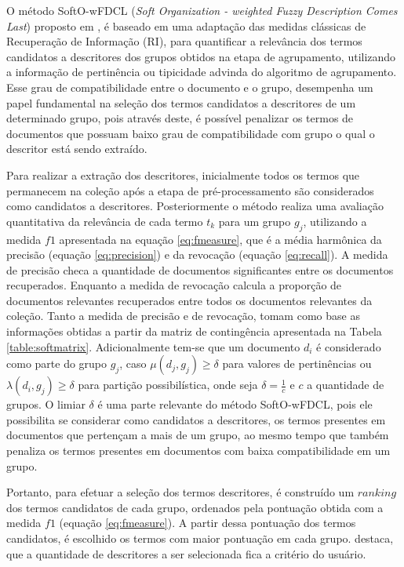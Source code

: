 O método SoftO-wFDCL ({\it Soft Organization - weighted Fuzzy Description Comes Last}) proposto em 
, é baseado em uma adaptação das medidas clássicas de Recuperação de
Informação (RI), para quantificar a relevância dos termos candidatos a descritores dos grupos
obtidos na etapa de agrupamento, utilizando a informação de pertinência ou tipicidade advinda do
algoritmo de agrupamento.  Esse grau de compatibilidade entre o documento e o grupo, desempenha um
papel fundamental na seleção dos termos candidatos a descritores de um determinado grupo, pois
através deste, é possível penalizar os termos de documentos que possuam baixo grau de
compatibilidade com grupo o qual o descritor está sendo extraído.  

Para realizar a extração dos descritores, inicialmente todos os termos que permanecem na coleção
após a etapa de pré-processamento são considerados como candidatos a descritores. Posteriormente o
método realiza uma avaliação quantitativa da relevância de cada termo $t_k$ para um grupo $g_j$,
utilizando a medida $f1$ apresentada na equação \ref{eq:fmeasure}, que é a média harmônica da
precisão (equação \ref{eq:precision}) e da revocação (equação \ref{eq:recall}).
A medida de precisão checa a quantidade de documentos significantes entre os documentos
recuperados. Enquanto a medida de revocação calcula a proporção de documentos relevantes recuperados
entre todos os documentos relevantes da coleção. Tanto a medida de precisão e de revocação, tomam
como base as informações obtidas a partir da matriz de contingência apresentada na Tabela
\ref{table:softmatrix}. Adicionalmente tem-se que um documento $d_i$ é considerado como parte do
grupo $g_j$, caso $\mu(d_j,g_j) \geq \delta$ para valores de pertinências ou $\lambda(d_i,g_j) \geq
\delta$ para partição possibilística, onde seja $\delta = \frac{1}{c}$ e $c$ a quantidade de
grupos. O limiar $\delta$ é uma parte relevante do método SoftO-wFDCL, pois ele possibilita se
considerar como candidatos a descritores, os termos presentes em documentos que pertençam a mais de
um grupo, ao mesmo tempo que também penaliza os termos presentes em documentos com baixa
compatibilidade em um grupo.

Portanto, para efetuar a seleção dos termos descritores, é construído um $ranking$ dos termos
candidatos de cada grupo, ordenados pela pontuação obtida com a medida $f1$ (equação
\ref{eq:fmeasure}). A partir dessa pontuação dos termos candidatos, é escolhido os termos com maior
pontuação em cada grupo.  destaca, que a quantidade de descritores a ser
selecionada fica a critério do usuário.

